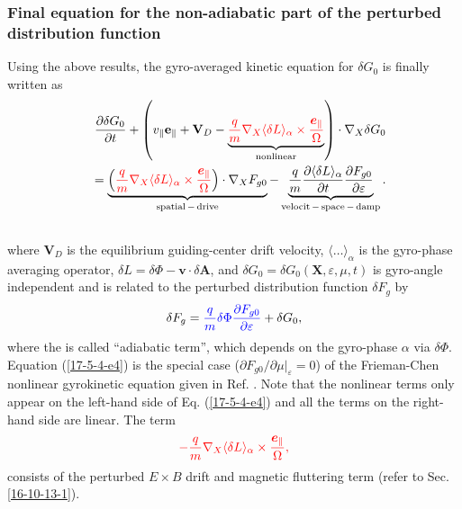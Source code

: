 \documentclass{article}
\newcommand{\nobracket}{}
\newcommand{\tmcolor}[2]{{\color{#1}{#2}}}
\newcommand{\tmmathbf}[1]{\ensuremath{\boldsymbol{#1}}}
\newcommand{\tmop}[1]{\ensuremath{\operatorname{#1}}}
\begin{document}
\subsubsection{Final equation for the non-adiabatic part of the perturbed
distribution function}

Using the above results, the gyro-averaged kinetic equation for $\delta G_0$
is finally written as
\begin{eqnarray}
  &  & \frac{\partial \delta G_0}{\partial t} + \left( v_{\parallel}
  \mathbf{e}_{\parallel} +\mathbf{V}_D - \underbrace{\tmcolor{red}{\frac{q}{m}
  \nabla_X \langle \delta L \rangle_{\alpha} \times
  \frac{\tmmathbf{e}_{\parallel}}{\Omega}}}_{\tmop{nonlinear}} \right) \cdot
  \nabla_X \delta G_0 \nonumber\\
  &  & = \underbrace{\left( \tmcolor{red}{\frac{q}{m} \nabla_X \langle \delta
  L \rangle_{\alpha} \times \frac{\tmmathbf{e}_{\parallel}}{\Omega}} \right)
  \cdot \nabla_X F_{g 0}}_{\tmop{spatial} - \tmop{drive}} -
  \underbrace{\frac{q}{m}  \frac{\partial \langle \delta L
  \rangle_{\alpha}}{\partial t}  \frac{\partial F_{g 0}}{\partial
  \varepsilon}}_{\tmop{velocit} - \tmop{space} - \tmop{damp}} . 
  \label{17-5-4-e4}\\
  &  &  \nonumber
\end{eqnarray}
where $\mathbf{V}_D$ is the equilibrium guiding-center drift velocity,
$\langle \ldots \rangle_{\alpha}$ is the gyro-phase averaging operator,
$\delta L = \delta \Phi -\mathbf{v} \cdot \delta \mathbf{A}$, and $\delta G_0
= \delta G_0 (\mathbf{X}, \varepsilon, \mu, t)$ is gyro-angle independent and
is related to the perturbed distribution function $\delta F_g$ by
\begin{equation}
  \delta F_g = \tmcolor{blue}{\frac{q}{m} \delta \Phi \frac{\partial F_{g
  0}}{\partial \varepsilon}} + \delta G_0,
\end{equation}
where the \tmcolor{blue}{first term} is called ``adiabatic term'', which
depends on the gyro-phase $\alpha$ via $\delta \Phi$. Equation
(\ref{17-5-4-e4}) is the special case ($\partial F_{g 0} / \partial \mu
|_{\varepsilon} \nobracket = 0$) of the Frieman-Chen nonlinear gyrokinetic
equation given in Ref. {\cite{frieman1982}}. Note that the nonlinear terms
only appear on the left-hand side of Eq. (\ref{17-5-4-e4}) and all the terms
on the right-hand side are linear. The term
\begin{equation}
  \tmcolor{red}{- \frac{q}{m} \nabla_X \langle \delta L \rangle_{\alpha}
  \times \frac{\tmmathbf{e}_{\parallel}}{\Omega},}
\end{equation}
consists of the perturbed $E \times B$ drift and magnetic fluttering term
(refer to Sec. \ref{16-10-13-1}).
\end{document}

